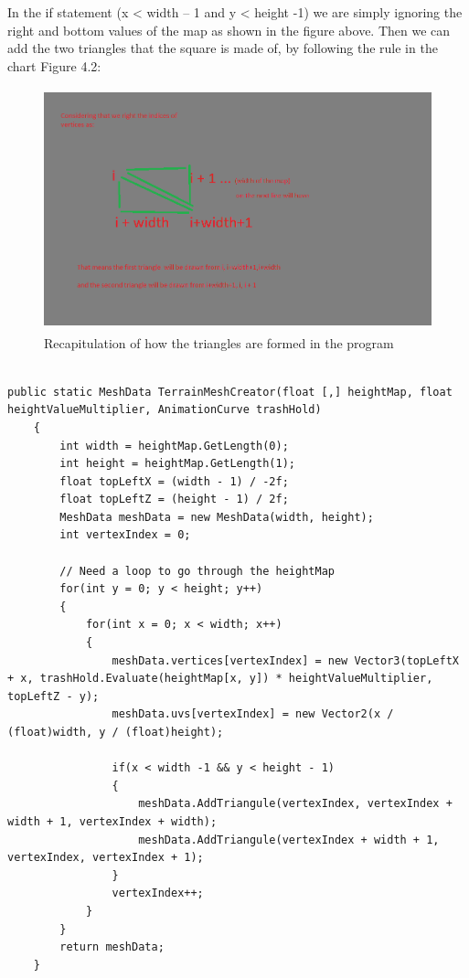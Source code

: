 \documentclass[a4paper,12pt]{book}
\begin{document}
In the if statement (x < width – 1 and y < height -1) we are simply ignoring the right and bottom values of the map as shown in the figure above. Then we can add the two triangles that the square is made of, by following the rule in the chart Figure 4.2:

\begin{figure}
\begin{center}
\includegraphics[height=70mm]{mesh_research_7.png}
\end{center}
\caption{Recapitulation of how the triangles are formed in the program}
\label{fig:pretty}
\end{figure}
 
\begin{lstlisting}
 
public static MeshData TerrainMeshCreator(float [,] heightMap, float heightValueMultiplier, AnimationCurve trashHold)
    {
        int width = heightMap.GetLength(0);
        int height = heightMap.GetLength(1);
        float topLeftX = (width - 1) / -2f;
        float topLeftZ = (height - 1) / 2f;
        MeshData meshData = new MeshData(width, height);
        int vertexIndex = 0;

        // Need a loop to go through the heightMap
        for(int y = 0; y < height; y++)
        {
            for(int x = 0; x < width; x++)
            {
                meshData.vertices[vertexIndex] = new Vector3(topLeftX + x, trashHold.Evaluate(heightMap[x, y]) * heightValueMultiplier, topLeftZ - y);
                meshData.uvs[vertexIndex] = new Vector2(x / (float)width, y / (float)height);

                if(x < width -1 && y < height - 1)
                {
                    meshData.AddTriangule(vertexIndex, vertexIndex + width + 1, vertexIndex + width);
                    meshData.AddTriangule(vertexIndex + width + 1, vertexIndex, vertexIndex + 1);
                }
                vertexIndex++;
            }
        }
        return meshData;
    }
\end{lstlisting}
\end{document}
